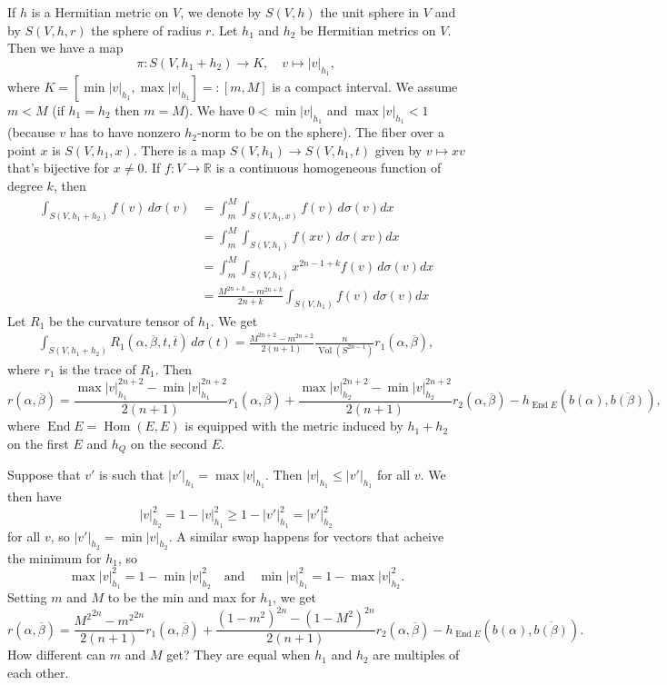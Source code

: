 \documentclass[10pt,a4paper]{article}
\newcommand{\kk}[1]{\mathbb{#1}}
\def\qandq{\quad\text{and}\quad}
\def\ov#1{\overline{#1}}
\DeclareMathOperator{\Vol}{Vol}
\DeclareMathOperator{\End}{End}
\DeclareMathOperator{\Hom}{Hom}
\begin{document}
If $h$ is a Hermitian metric on $V$, we denote by $S(V,h)$ the unit sphere in $V$ and by $S(V,h,r)$ the sphere of radius $r$. Let $h_1$ and $h_2$ be Hermitian metrics on $V$. Then we have a map
\[
\pi : S(V,h_1+h_2) \to K,
\quad
v \mapsto |v|_{h_1},
\]
where $K = [\min |v|_{h_1},\max |v|_{h_1}] =: [m,M]$ is a compact interval. We assume $m < M$ (if $h_1 = h_2$ then $m = M$). We have $0 < \min |v|_{h_1}$ and $\max |v|_{h_1} < 1$ (because $v$ has to have nonzero $h_2$-norm to be on the sphere).
The fiber over a point $x$ is $S(V,h_1,x)$. There is a map $S(V,h_1) \to S(V,h_1,t)$ given by $v \mapsto xv$ that's bijective for $x \not= 0$. If $f : V \to \kk R$ is a continuous homogeneous function of degree $k$, then
\begin{align*}
\int_{S(V,h_1+h_2)} f(v) \, d\sigma(v)
&= \int_m^M \int_{S(V,h_1,x)} f(v) \, d\sigma(v) dx
\\
&= \int_m^M \int_{S(V,h_1)} f(xv) \, d\sigma(xv) dx
\\
&= \int_m^M \int_{S(V,h_1)} x^{2n-1+k} f(v) \, d\sigma(v) dx
\\
&= \frac{M^{2n+k}-m^{2n+k}}{2n+k} \int_{S(V,h_1)} f(v) \, d\sigma(v) dx
\end{align*}
Let $R_1$ be the curvature tensor of $h_1$. We get
\begin{align*}
\int_{S(V,h_1+h_2)} R_1(\alpha, \ov\beta, t, \ov t) \,d\sigma(t)
= \frac{M^{2n+2}-m^{2n+2}}{2(n+1)} \frac{n}{\Vol(S^{2n-1})} r_1(\alpha, \ov\beta),
\end{align*}
where $r_1$ is the trace of $R_1$. Then
\[
r(\alpha, \ov\beta)
= \frac{\max |v|_{h_1}^{2n+2} - \min |v|_{h_1}^{2n+2}}{2(n+1)} r_1(\alpha, \ov\beta)
+ \frac{\max |v|_{h_2}^{2n+2} - \min |v|_{h_2}^{2n+2}}{2(n+1)} r_2(\alpha, \ov\beta)
- h_{\End E}(b(\alpha), \ov{b(\beta)}),
\]
where $\End E = \Hom(E,E)$ is equipped with the metric induced by $h_1+h_2$ on the first $E$ and $h_Q$ on the second $E$.

Suppose that $v'$ is such that $|v'|_{h_1} = \max |v|_{h_1}$. Then $|v|_{h_1} \leq |v'|_{h_1}$ for all $v$. We then have
\[
|v|_{h_2}^2 = 1 - |v|_{h_1}^2 \geq 1 - |v'|_{h_1}^2 = |v'|_{h_2}^2
\]
for all $v$, so $|v'|_{h_2} = \min |v|_{h_2}$. A similar swap happens for vectors that acheive the minimum for $h_1$, so
\[
\max |v|_{h_1}^2 = 1 - \min |v|_{h_2}^2
\qandq
\min |v|_{h_1}^2 = 1 - \max |v|_{h_2}^2.
\]
Setting $m$ and $M$ to be the min and max for $h_1$, we get
\[
r(\alpha, \ov\beta)
= \frac{{M^2}^{2n}-{m^2}^{2n}}{2(n+1)} r_1(\alpha, \ov\beta)
+ \frac{(1-m^2)^{2n}-(1-M^2)^{2n}}{2(n+1)} r_2(\alpha, \ov\beta)
- h_{\End E}(b(\alpha), \ov{b(\beta)}).
\]
How different can $m$ and $M$ get? They are equal when $h_1$ and $h_2$ are multiples of each other.
\end{document}
